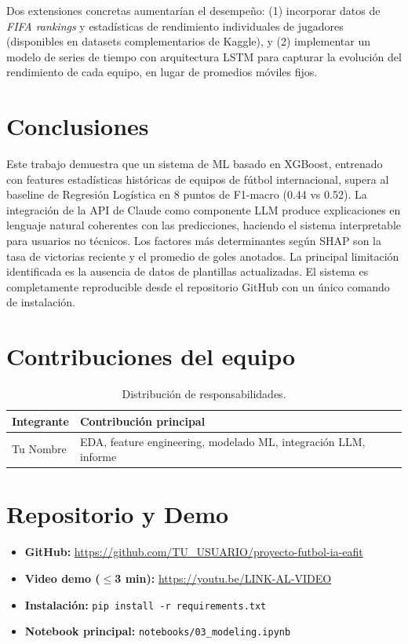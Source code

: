 \documentclass[10pt,twocolumn]{article}
\begin{document}
Dos extensiones concretas aumentarían el desempeño:
(1) incorporar datos de \textit{FIFA rankings} y estadísticas
de rendimiento individuales de jugadores (disponibles en
datasets complementarios de Kaggle), y
(2) implementar un modelo de series de tiempo con arquitectura
LSTM para capturar la evolución del rendimiento de cada equipo,
en lugar de promedios móviles fijos.

\section{Conclusiones}

Este trabajo demuestra que un sistema de ML basado en XGBoost,
entrenado con features estadísticas históricas de equipos de fútbol
internacional, supera al baseline de Regresión Logística en 8 puntos
de F1-macro (0.44 vs 0.52). La integración de la API de Claude como
componente LLM produce explicaciones en lenguaje natural coherentes
con las predicciones, haciendo el sistema interpretable para
usuarios no técnicos. Los factores más determinantes según SHAP
son la tasa de victorias reciente y el promedio de goles anotados.
La principal limitación identificada es la ausencia de datos de
plantillas actualizadas. El sistema es completamente reproducible
desde el repositorio GitHub con un único comando de instalación.

\section*{Contribuciones del equipo}

\begin{table}[H]
\centering
\begin{tabular}{lp{5.2cm}}
\toprule
\textbf{Integrante} & \textbf{Contribución principal} \\
\midrule
Tu Nombre & EDA, feature engineering, modelado ML, integración LLM, informe \\
\bottomrule
\end{tabular}
\caption*{Distribución de responsabilidades.}
\end{table}

\section*{Repositorio y Demo}

\begin{itemize}[leftmargin=*,topsep=2pt,itemsep=1pt]
  \item \textbf{GitHub:} \url{https://github.com/TU_USUARIO/proyecto-futbol-ia-eafit}
  \item \textbf{Video demo ($\leq$3 min):} \url{https://youtu.be/LINK-AL-VIDEO}
  \item \textbf{Instalación:} \texttt{pip install -r requirements.txt}
  \item \textbf{Notebook principal:} \texttt{notebooks/03\_modeling.ipynb}
\end{itemize}
\end{document}
